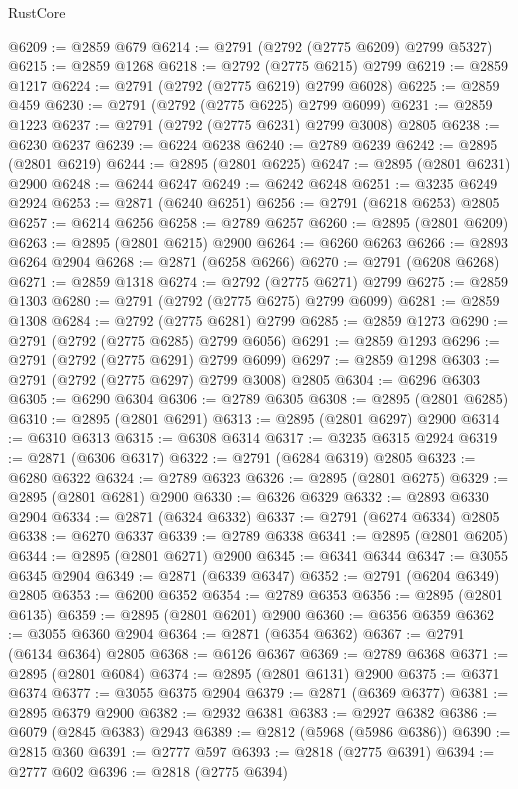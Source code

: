 \begin{lexlean}{RustCore}
\begin{coremodule}
@6209 := @2859 @679
@6214 := @2791 (@2792 (@2775 @6209) @2799 @5327)
@6215 := @2859 @1268
@6218 := @2792 (@2775 @6215) @2799
@6219 := @2859 @1217
@6224 := @2791 (@2792 (@2775 @6219) @2799 @6028)
@6225 := @2859 @459
@6230 := @2791 (@2792 (@2775 @6225) @2799 @6099)
@6231 := @2859 @1223
@6237 := @2791 (@2792 (@2775 @6231) @2799 @3008) @2805
@6238 := @6230 @6237
@6239 := @6224 @6238
@6240 := @2789 @6239
@6242 := @2895 (@2801 @6219)
@6244 := @2895 (@2801 @6225)
@6247 := @2895 (@2801 @6231) @2900
@6248 := @6244 @6247
@6249 := @6242 @6248
@6251 := @3235 @6249 @2924
@6253 := @2871 (@6240 @6251)
@6256 := @2791 (@6218 @6253) @2805
@6257 := @6214 @6256
@6258 := @2789 @6257
@6260 := @2895 (@2801 @6209)
@6263 := @2895 (@2801 @6215) @2900
@6264 := @6260 @6263
@6266 := @2893 @6264 @2904
@6268 := @2871 (@6258 @6266)
@6270 := @2791 (@6208 @6268)
@6271 := @2859 @1318
@6274 := @2792 (@2775 @6271) @2799
@6275 := @2859 @1303
@6280 := @2791 (@2792 (@2775 @6275) @2799 @6099)
@6281 := @2859 @1308
@6284 := @2792 (@2775 @6281) @2799
@6285 := @2859 @1273
@6290 := @2791 (@2792 (@2775 @6285) @2799 @6056)
@6291 := @2859 @1293
@6296 := @2791 (@2792 (@2775 @6291) @2799 @6099)
@6297 := @2859 @1298
@6303 := @2791 (@2792 (@2775 @6297) @2799 @3008) @2805
@6304 := @6296 @6303
@6305 := @6290 @6304
@6306 := @2789 @6305
@6308 := @2895 (@2801 @6285)
@6310 := @2895 (@2801 @6291)
@6313 := @2895 (@2801 @6297) @2900
@6314 := @6310 @6313
@6315 := @6308 @6314
@6317 := @3235 @6315 @2924
@6319 := @2871 (@6306 @6317)
@6322 := @2791 (@6284 @6319) @2805
@6323 := @6280 @6322
@6324 := @2789 @6323
@6326 := @2895 (@2801 @6275)
@6329 := @2895 (@2801 @6281) @2900
@6330 := @6326 @6329
@6332 := @2893 @6330 @2904
@6334 := @2871 (@6324 @6332)
@6337 := @2791 (@6274 @6334) @2805
@6338 := @6270 @6337
@6339 := @2789 @6338
@6341 := @2895 (@2801 @6205)
@6344 := @2895 (@2801 @6271) @2900
@6345 := @6341 @6344
@6347 := @3055 @6345 @2904
@6349 := @2871 (@6339 @6347)
@6352 := @2791 (@6204 @6349) @2805
@6353 := @6200 @6352
@6354 := @2789 @6353
@6356 := @2895 (@2801 @6135)
@6359 := @2895 (@2801 @6201) @2900
@6360 := @6356 @6359
@6362 := @3055 @6360 @2904
@6364 := @2871 (@6354 @6362)
@6367 := @2791 (@6134 @6364) @2805
@6368 := @6126 @6367
@6369 := @2789 @6368
@6371 := @2895 (@2801 @6084)
@6374 := @2895 (@2801 @6131) @2900
@6375 := @6371 @6374
@6377 := @3055 @6375 @2904
@6379 := @2871 (@6369 @6377)
@6381 := @2895 @6379 @2900
@6382 := @2932 @6381
@6383 := @2927 @6382
@6386 := @6079 (@2845 @6383) @2943
@6389 := @2812 (@5968 (@5986 @6386))
@6390 := @2815 @360
@6391 := @2777 @597
@6393 := @2818 (@2775 @6391)
@6394 := @2777 @602
@6396 := @2818 (@2775 @6394)

\end{coremodule}
\end{lexlean}
